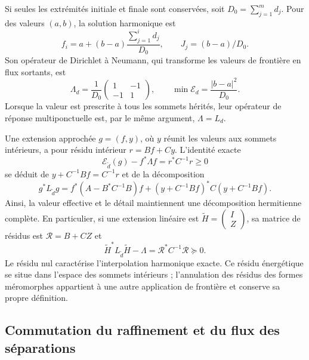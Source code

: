 Si seules les extrémités initiale et finale sont conservées, soit \(D_0=\sum_{j=1}^md_j\). Pour des valeurs \((a,b)\), la solution harmonique est
\[
 f_i=a+(b-a)\frac{\sum_{j=1}^id_j}{D_0},\qquad
 J_j=(b-a)/D_0.
\]
Son opérateur de Dirichlet à Neumann, qui transforme les valeurs de frontière en
flux sortants, est
\begin{equation}
 \Lambda_d=\frac1{D_0}
 \begin{pmatrix}1&-1\\-1&1\end{pmatrix},\qquad
 \min\mathcal E_d=\frac{|b-a|^2}{D_0}.
 \label{eq:dtn-intervalar-k}
\end{equation}
Lorsque la valeur est prescrite à tous les sommets hérités, leur opérateur de réponse multiponctuelle est, par le même argument, \(\Lambda=L_d\).

Une extension approchée \(g=(f,y)\), où \(y\) réunit les valeurs
aux sommets intérieurs, a pour résidu intérieur
\(r=Bf+Cy\). L’identité exacte
\begin{equation}
 \mathcal E_{\widetilde d}(g)-f^*\Lambda f
 =r^*C^{-1}r\ge0
 \label{eq:residual-dtn-k}
\end{equation}
se déduit de \(y+C^{-1}Bf=C^{-1}r\) et de la décomposition
\[
 g^*L_{\widetilde d}g
 =f^*(A-B^*C^{-1}B)f
 +(y+C^{-1}Bf)^*C(y+C^{-1}Bf).
\]
Ainsi, la valeur effective et le détail maintiennent une décomposition
hermitienne complète. En particulier, si une
extension linéaire est \(\widetilde H=\begin{pmatrix}I\\Z\end{pmatrix}\), sa matrice de résidus est \(\mathscr R=B+CZ\) et
\[
 \widetilde H^*L_{\widetilde d}\widetilde H-\Lambda
 =\mathscr R^*C^{-1}\mathscr R\succeq0.
\]
Le résidu nul caractérise l'interpolation harmonique exacte. Ce résidu énergétique se situe dans l'espace des sommets intérieurs ; l'annulation des résidus des formes méromorphes appartient à une autre application de frontière et conserve sa propre définition.

\subsection{Commutation du raffinement et du flux des séparations}

